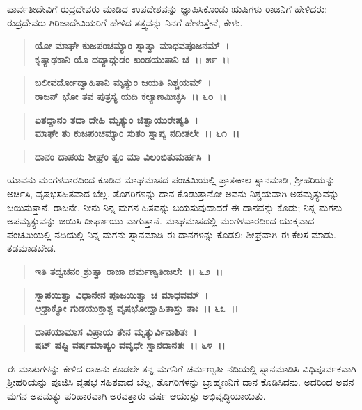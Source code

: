 ಪಾರ್ವತೀದೇವಿಗೆ ರುದ್ರದೇವರು ಮಾಡಿದ ಉಪದೇಶವನ್ನು ಜ್ಞಾಪಿಸಿಕೊಂಡು ಋಷಿಗಳು ರಾಜನಿಗೆ ಹೇಳಿದರು: ರುದ್ರದೇವರು ಗಿರಿಜಾದೇವಿಯರಿಗೆ ಹೇಳಿದ ತತ್ತ್ವವನ್ನು ನಿನಗೆ ಹೇಳುತ್ತೇನೆ, ಕೇಳು.

\begin{verse}
\textbf{ಯೋ ಮಾಘೇ ಕುಜಪಂಚಮ್ಯಾಂ ಸ್ನಾತ್ವಾ ಮಾಧವಪೂಜನಮ್~।}\\\textbf{ಕೃತ್ಯಾಢಕಾನಿ ಯೊ ದದ್ಯಾದ್ಗುಡಂ ಖಂಡಯುತಾನಿ ಚ~।। ೫೯~।।} 
\end{verse}

\begin{verse}
\textbf{ಬಲೀವರ್ದೋದ್ವಾಹಿತಾನಿ ಮೃತ್ಯುಂ ಜಯತಿ ನಿಶ್ಚಯಮ್~।}\\\textbf{ರಾಜನ್ ಭೋ ತವ ಪುತ್ರಸ್ಯ ಯದಿ ಕಲ್ಯಾಣಮಿಚ್ಛಸಿ~।। ೬೦~।। }
\end{verse}

\begin{verse}
\textbf{ಏತದ್ದಾನಂ ತದಾ ದೇಹಿ ಮೃತ್ಯುಂ ಜಿತ್ವಾಯುರೇಷ್ಯತಿ~।}\\\textbf{ಮಾಘೇ ತು ಕುಜಪಂಚಮ್ಯಾಂ ಸುತಂ ಸ್ನಾಪ್ಯ ನದೀತಲೇ~।। ೬೧~।। }
\end{verse}

\begin{verse}
\textbf{ದಾನಂ ದಾಪಯ ಶೀಘ್ರಂ ತ್ವಂ ಮಾ ವಿಲಂಬಿತುಮರ್ಹಸಿ~।}
\end{verse}

ಯಾವನು ಮಂಗಳವಾರದಿಂದ ಕೂಡಿದ ಮಾಘಮಾಸದ ಪಂಚಮಿಯಲ್ಲಿ ಪ್ರಾತಃಕಾಲ ಸ್ನಾನಮಾಡಿ, ಶ‍್ರೀಹರಿಯನ್ನು ಅರ್ಚಿಸಿ, ವೃಷಭಸಹಿತವಾದ ಬೆಲ್ಲ, ತೊಗರಿಗಳನ್ನು ದಾನ ಕೊಡುತ್ತಾನೋ ಅವನು ನಿಶ್ಚಯವಾಗಿ ಅಪಮೃತ್ಯುವನ್ನು ಜಯಿಸುತ್ತಾನೆ. ರಾಜನೇ, ನೀನು ನಿನ್ನ ಮಗನ ಹಿತವನ್ನು ಬಯಸುವುದಾದರೆ ಈ ದಾನವನ್ನು ಕೊಡು; ನಿನ್ನ ಮಗನು ಅಪಮೃತ್ಯುವನ್ನು ಜಯಿಸಿ ದೀರ್ಘಾಯು ವಾಗುತ್ತಾನೆ. ಮಾಘಮಾಸದಲ್ಲಿ ಮಂಗಳವಾರದಿಂದ ಯುಕ್ತವಾದ ಪಂಚಮಿಯಲ್ಲಿ ನದಿಯಲ್ಲಿ ನಿನ್ನ ಮಗನು ಸ್ನಾನಮಾಡಿ ಈ ದಾನಗಳನ್ನು ಕೊಡಲಿ; ಶೀಘ್ರವಾಗಿ ಈ ಕೆಲಸ ಮಾಡು. ತಡಮಾಡಬೇಡ.

\begin{verse}
\textbf{ಇತಿ ತದ್ವಚನಂ ಶ್ರುತ್ವಾ ರಾಜಾ ಚರ್ಮಣ್ವತೀಜಲೇ~।। ೬೨~।।} 
\end{verse}

\begin{verse}
\textbf{ಸ್ನಾಪಯಿತ್ವಾ ವಿಧಾನೇನ ಪೂಜಯಿತ್ವಾ ಚ ಮಾಧವಮ್~।}\\\textbf{ಆಢ್ರಾಕ್ಯೋ ಗುಡಯುಕ್ತಾಶ್ಚ ವೃಷಭೋದ್ವಾಹಿತಾಸ್ತು ತಾಃ~।। ೬೩~।। }
\end{verse}

\begin{verse}
\textbf{ದಾಪಯಾಮಾಸ ವಿಪ್ರಾಯ ತೇನ ಮೃತ್ಯುರ್ವಿನಾಶಿತಃ~।}\\\textbf{ಷಟ್ ಷಷ್ಟಿ ವರ್ಷಮಾಷ್ಯಂ ವವೃಧೇ ಸ್ನಾನದಾನತಃ~।। ೬೪~।।}
\end{verse}

ಈ ಮಾತುಗಳನ್ನು ಕೇಳಿದ ರಾಜನು ಕೂಡಲೇ ತನ್ನ ಮಗನಿಗೆ ಚರ್ಮಣ್ವತೀ ನದಿಯಲ್ಲಿ ಸ್ನಾನಮಾಡಿಸಿ ವಿಧಿಪೂರ್ವಕವಾಗಿ ಶ‍್ರೀಹರಿಯನ್ನು ಪೂಜಿಸಿ ವೃಷಭ ಸಹಿತವಾದ ಬೆಲ್ಲ, ತೊಗರಿಗಳನ್ನು ಬ್ರಾಹ್ಮಣನಿಗೆ ದಾನ ಕೊಡಿಸಿದನು. ಅದರಿಂದ ಅವನ ಮಗನ ಅಪಮತ್ಯು ಪರಿಹಾರವಾಗಿ ಅರವತ್ತಾರು ವರ್ಷ ಆಯುಸ್ಸು ಅಭಿವೃದ್ಧಿಯಾಯಿತು.

